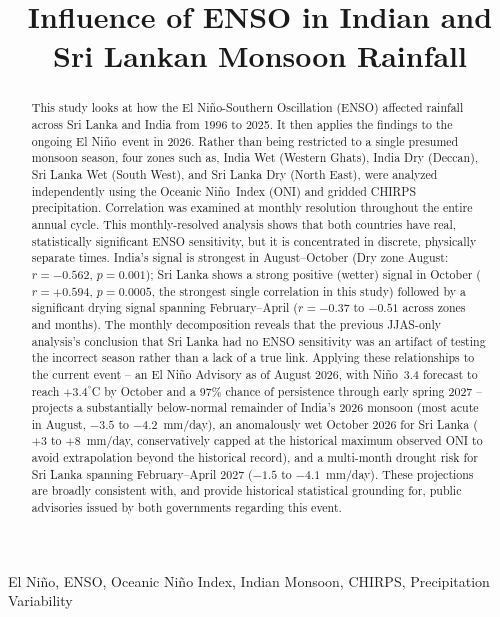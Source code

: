 \documentclass{article}
\title{Influence of ENSO in Indian and Sri Lankan Monsoon Rainfall}
\begin{document}
\ninept
\maketitle

\begin{abstract}
This study looks at how the El Ni\~{n}o-Southern Oscillation (ENSO) affected rainfall across
Sri Lanka and India from 1996 to 2025. It then applies the findings to the ongoing
El Ni\~{n}o event in 2026. Rather than being restricted to a single presumed monsoon season,
four zones such as, India Wet (Western Ghats), India Dry (Deccan), Sri Lanka Wet (South West),
and Sri Lanka Dry (North East), were analyzed independently using the Oceanic Ni\~{n}o Index
(ONI) and gridded CHIRPS precipitation. Correlation was examined at monthly resolution
throughout the entire annual cycle. This monthly-resolved analysis shows that both countries
have real, statistically significant ENSO sensitivity, but it is concentrated in discrete,
physically separate times. India's signal is strongest in August--October
(Dry zone August:$r=-0.562$, $p=0.001$); Sri Lanka shows a strong positive (wetter) signal
in October ($r=+0.594$, $p=0.0005$, the strongest single correlation in this study) followed
by a significant drying signal spanning February--April ($r=-0.37$ to $-0.51$ across zones and months).
The monthly decomposition reveals that the previous JJAS-only analysis's conclusion that
Sri Lanka had no ENSO sensitivity was an artifact of testing the incorrect season rather
than a lack of a true link. Applying these relationships to the current event -- an
El Ni\~{n}o Advisory as of August 2026, with Ni\~{n}o~3.4 forecast to reach $+3.4^{\circ}$C
by October and a 97\% chance of persistence through early spring 2027 -- projects
a substantially below-normal remainder of India's 2026 monsoon (most acute in August, 
$-3.5$ to $-4.2$~mm/day), an anomalously wet October 2026 for Sri Lanka ($+3$ to $+8$~mm/day,
conservatively capped at the historical maximum observed ONI to avoid extrapolation
beyond the historical record), and a multi-month drought risk for Sri Lanka spanning
February--April 2027 ($-1.5$ to $-4.1$~mm/day). These projections are broadly consistent
with, and provide historical statistical grounding for, public advisories issued by both
governments regarding this event.
\end{abstract}

\begin{keywords}
El Ni\~{n}o, ENSO, Oceanic Ni\~{n}o Index, Indian Monsoon, CHIRPS, Precipitation Variability
\end{keywords}
\end{document}
